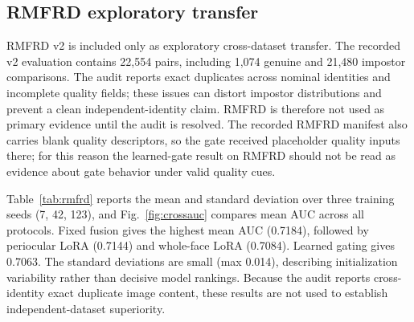\documentclass[10pt,journal,compsoc]{IEEEtran}
\begin{document}
\subsection{RMFRD exploratory transfer}
RMFRD v2 is included only as exploratory cross-dataset transfer. The recorded v2 evaluation contains 22,554 pairs, including 1,074 genuine and 21,480 impostor comparisons. The audit reports exact duplicates across nominal identities and incomplete quality fields; these issues can distort impostor distributions and prevent a clean independent-identity claim. RMFRD is therefore not used as primary evidence until the audit is resolved. The recorded RMFRD manifest also carries blank quality descriptors, so the gate received placeholder quality inputs there; for this reason the learned-gate result on RMFRD should not be read as evidence about gate behavior under valid quality cues.

Table~\ref{tab:rmfrd} reports the mean and standard deviation over three training seeds (7, 42, 123), and Fig.~\ref{fig:crossauc} compares mean AUC across all protocols. Fixed fusion gives the highest mean AUC (0.7184), followed by periocular LoRA (0.7144) and whole-face LoRA (0.7084). Learned gating gives 0.7063. The standard deviations are small (max 0.014), describing initialization variability rather than decisive model rankings. Because the audit reports cross-identity exact duplicate image content, these results are not used to establish independent-dataset superiority.
\end{document}
